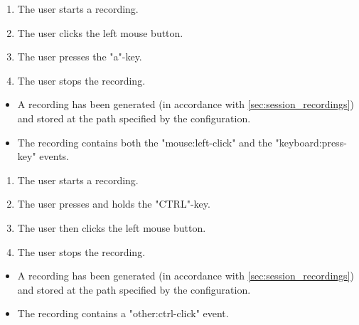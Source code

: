 \begin{tests}
    {\begin{enumerate}
        \item The \gls{user} starts a recording.
        \item The \gls{user} clicks the left mouse button.
        \item The \gls{user} presses the "a"-key.
        \item The \gls{user} stops the recording.
    \end{enumerate}}
    {\begin{itemize}
        \item A recording has been generated (in accordance with \ref{sec:session_recordings}) and stored at the path specified by the configuration.
        \item The recording contains both the "mouse:left-click" and the "keyboard:press-key" events.
    \end{itemize}}

    {\begin{enumerate}
        \item The \gls{user} starts a recording.
        \item The \gls{user} presses and holds the "CTRL"-key.
        \item The \gls{user} then clicks the left mouse button.
        \item The \gls{user} stops the recording.
    \end{enumerate}}
    {\begin{itemize}
        \item A recording has been generated (in accordance with \ref{sec:session_recordings}) and stored at the path specified by the configuration.
        \item The recording contains a "other:ctrl-click" event.
    \end{itemize}}


\end{tests}
